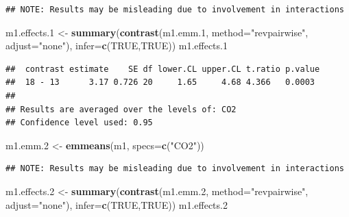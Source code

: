 \documentclass[]{book}
\newenvironment{Shaded}{\begin{snugshade}}{\end{snugshade}}
\newcommand{\KeywordTok}[1]{\textcolor[rgb]{0.13,0.29,0.53}{\textbf{#1}}}
\newcommand{\DataTypeTok}[1]{\textcolor[rgb]{0.13,0.29,0.53}{#1}}
\newcommand{\DecValTok}[1]{\textcolor[rgb]{0.00,0.00,0.81}{#1}}
\newcommand{\StringTok}[1]{\textcolor[rgb]{0.31,0.60,0.02}{#1}}
\newcommand{\OtherTok}[1]{\textcolor[rgb]{0.56,0.35,0.01}{#1}}
\newcommand{\NormalTok}[1]{#1}
\begin{document}
\begin{verbatim}
## NOTE: Results may be misleading due to involvement in interactions
\end{verbatim}

\begin{Shaded}
\begin{Highlighting}[]
\NormalTok{m1.effects.}\DecValTok{1}\NormalTok{ <-}\StringTok{ }\KeywordTok{summary}\NormalTok{(}\KeywordTok{contrast}\NormalTok{(m1.emm.}\DecValTok{1}\NormalTok{,}
                 \DataTypeTok{method=}\StringTok{"revpairwise"}\NormalTok{,}
                 \DataTypeTok{adjust=}\StringTok{"none"}\NormalTok{),}
        \DataTypeTok{infer=}\KeywordTok{c}\NormalTok{(}\OtherTok{TRUE}\NormalTok{,}\OtherTok{TRUE}\NormalTok{))}
\NormalTok{m1.effects.}\DecValTok{1}
\end{Highlighting}
\end{Shaded}

\begin{verbatim}
##  contrast estimate    SE df lower.CL upper.CL t.ratio p.value
##  18 - 13      3.17 0.726 20     1.65     4.68 4.366   0.0003 
## 
## Results are averaged over the levels of: CO2 
## Confidence level used: 0.95
\end{verbatim}

\begin{Shaded}
\begin{Highlighting}[]
\NormalTok{m1.emm.}\DecValTok{2}\NormalTok{ <-}\StringTok{ }\KeywordTok{emmeans}\NormalTok{(m1, }\DataTypeTok{specs=}\KeywordTok{c}\NormalTok{(}\StringTok{"CO2"}\NormalTok{))}
\end{Highlighting}
\end{Shaded}

\begin{verbatim}
## NOTE: Results may be misleading due to involvement in interactions
\end{verbatim}

\begin{Shaded}
\begin{Highlighting}[]
\NormalTok{m1.effects.}\DecValTok{2}\NormalTok{ <-}\StringTok{ }\KeywordTok{summary}\NormalTok{(}\KeywordTok{contrast}\NormalTok{(m1.emm.}\DecValTok{2}\NormalTok{,}
                 \DataTypeTok{method=}\StringTok{"revpairwise"}\NormalTok{,}
                 \DataTypeTok{adjust=}\StringTok{"none"}\NormalTok{),}
        \DataTypeTok{infer=}\KeywordTok{c}\NormalTok{(}\OtherTok{TRUE}\NormalTok{,}\OtherTok{TRUE}\NormalTok{))}
\NormalTok{m1.effects.}\DecValTok{2}
\end{Highlighting}
\end{Shaded}
\end{document}

